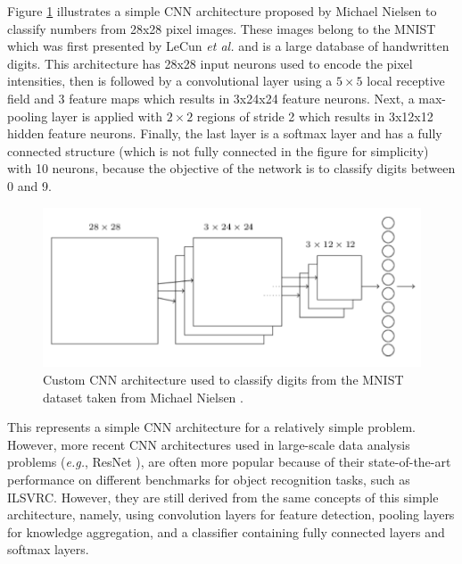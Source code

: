     Figure \ref{fig:cnn} illustrates a simple \ac{CNN} architecture proposed by Michael Nielsen to classify numbers from 28x28 pixel images. These images belong to the \ac{MNIST} which was first presented by LeCun \textit{et al.} \cite{LeCun1998} and is a large database of handwritten digits. This architecture has 28x28 input neurons used to encode the pixel intensities, then is followed by a convolutional layer using a $5 \times 5$ local receptive field and 3 feature maps which results in 3x24x24 feature neurons. Next, a max-pooling layer is applied with $2 \times 2$ regions of stride 2 which results in 3x12x12 hidden feature neurons. Finally, the last layer is a softmax layer and has a fully connected structure (which is not fully connected in the figure for simplicity) with 10 neurons, because the objective of the network is to classify digits between 0 and 9. \par
    \begin{figure}[ht]
      \centering
        \includegraphics[width=0.7\linewidth]{figs/cnn.png}
      \caption{Custom \ac{CNN} architecture used to classify digits from the \ac{MNIST} dataset taken from Michael Nielsen \cite{Nielsen2017a}.}
      \label{fig:cnn}
    \end{figure}
    
    This represents a simple \ac{CNN} architecture for a relatively simple problem. However, more recent \ac{CNN} architectures used in large-scale data analysis problems (\textit{e.g.}, ResNet \cite{resnet}), are often more popular because of their state-of-the-art performance on different benchmarks for object recognition tasks, such as \ac{ILSVRC}. However, they are still derived from the same concepts of this simple architecture, namely, using convolution layers for feature detection, pooling layers for knowledge aggregation, and a classifier containing fully connected layers and softmax layers. \par
    
